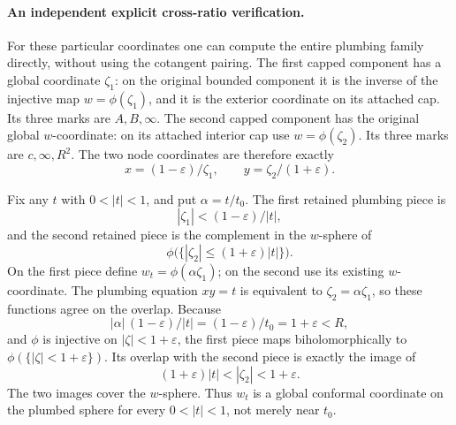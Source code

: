 \paragraph{An independent explicit cross-ratio verification.}
For these particular coordinates one can compute the entire plumbing family directly, without using the cotangent pairing. The first capped component has a global coordinate $\zeta_1$: on the original bounded component it is the inverse of the injective map $w=\phi(\zeta_1)$, and it is the exterior coordinate on its attached cap. Its three marks are $A,B,\infty$. The second capped component has the original global $w$-coordinate: on its attached interior cap use $w=\phi(\zeta_2)$. Its three marks are $c,\infty,R^2$. The two node coordinates are therefore exactly
\[
 x=(1-\varepsilon)/\zeta_1,
 \qquad y=\zeta_2/(1+\varepsilon).
\]

Fix any $t$ with $0<|t|<1$, and put $\alpha=t/t_0$. The first retained plumbing piece is
\[
 |\zeta_1|<(1-\varepsilon)/|t|,
\]
and the second retained piece is the complement in the $w$-sphere of
\[
 \phi\bigl(\{|\zeta_2|\le(1+\varepsilon)|t|\}\bigr).
\]
On the first piece define $w_t=\phi(\alpha\zeta_1)$; on the second use its existing $w$-coordinate. The plumbing equation $xy=t$ is equivalent to $\zeta_2=\alpha\zeta_1$, so these functions agree on the overlap. Because
\[
 |\alpha|\,(1-\varepsilon)/|t|
       =(1-\varepsilon)/t_0=1+\varepsilon<R,
\]
and $\phi$ is injective on $|\zeta|<1+\varepsilon$, the first piece maps biholomorphically to $\phi(\{|\zeta|<1+\varepsilon\})$. Its overlap with the second piece is exactly the image of
\[
 (1+\varepsilon)|t|<|\zeta_2|<1+\varepsilon.
\]
The two images cover the $w$-sphere. Thus $w_t$ is a global conformal coordinate on the plumbed sphere for every $0<|t|<1$, not merely near $t_0$.

